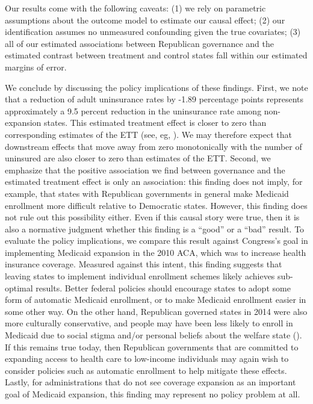 \documentclass[12pt]{article}
\begin{document}
Our results come with the following caveats: (1) we rely on parametric assumptions about the outcome model to estimate our causal effect; (2) our identification assumes no unmeasured confounding given the true covariates; (3) all of our estimated associations between Republican governance and the estimated contrast between treatment and control states fall within our estimated margins of error. 

We conclude by discussing the policy implications of these findings. First, we note that a reduction of adult uninsurance rates by -1.89 percentage points represents approximately a 9.5 percent reduction in the uninsurance rate among non-expansion states. This estimated treatment effect is closer to zero than corresponding estimates of the ETT (see, eg, \cite{courtemanche2017early}). We may therefore expect that downstream effects that move away from zero monotonically with the number of uninsured are also closer to zero than estimates of the ETT. Second, we emphasize that the positive association we find between governance and the estimated treatment effect is only an association: this finding does not imply, for example, that states with Republican governments in general make Medicaid enrollment more difficult relative to Democratic states. However, this finding does not rule out this possibility either. Even if this causal story were true, then it is also a normative judgment whether this finding is a ``good'' or a ``bad'' result. To evaluate the policy implications, we compare this result against Congress's goal in implementing Medicaid expansion in the 2010 ACA, which was to increase health insurance coverage. Measured against this intent, this finding suggests that leaving states to implement individual enrollment schemes likely achieves sub-optimal results. Better federal policies should encourage states to adopt some form of automatic Medicaid enrollment, or to make Medicaid enrollment easier in some other way. On the other hand, Republican governed states in 2014 were also more culturally conservative, and people may have been less likely to enroll in Medicaid due to social stigma and/or personal beliefs about the welfare state (\cite{sommers2012understanding}). If this remains true today, then Republican governments that are committed to expanding access to health care to low-income individuals may again wish to consider policies such as automatic enrollment to help mitigate these effects. Lastly, for administrations that do not see coverage expansion as an important goal of Medicaid expansion, this finding may represent no policy problem at all.
\end{document}
